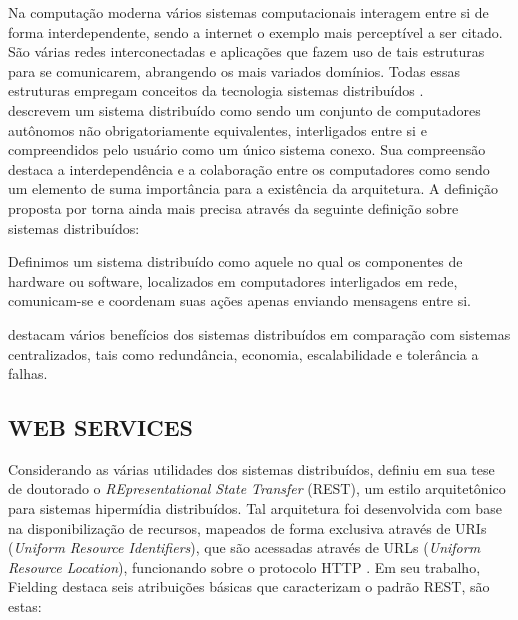 Na computação moderna vários sistemas computacionais interagem entre si de forma interdependente, sendo a internet o exemplo mais perceptível a ser citado. São várias redes interconectadas e aplicações que fazem uso de tais estruturas para se comunicarem, abrangendo os mais variados domínios. Todas essas estruturas empregam conceitos da tecnologia sistemas distribuídos \cite{puder2011distributed}.\\
 descrevem um sistema distribuído como sendo um conjunto de computadores autônomos não obrigatoriamente equivalentes, interligados entre si e compreendidos pelo usuário como um único sistema conexo. Sua compreensão destaca a interdependência e a colaboração entre os computadores como sendo um elemento de suma importância para a existência da arquitetura. A definição proposta por  torna ainda mais precisa através da seguinte definição sobre sistemas distribuídos:

\begin{citacao}
	Definimos um sistema distribuído como aquele no qual os componentes de hardware ou software, localizados em computadores interligados em rede, comunicam-se e coordenam suas ações apenas enviando mensagens entre si.
\end{citacao}

 destacam vários benefícios dos sistemas distribuídos em comparação com sistemas centralizados, tais como redundância, economia, escalabilidade e tolerância a falhas.

\subsection{WEB SERVICES}

Considerando as várias utilidades dos sistemas distribuídos,  definiu em sua tese de doutorado o \textit{REpresentational State Transfer} (REST), um estilo arquitetônico para sistemas hipermídia distribuídos. Tal arquitetura foi desenvolvida com base na disponibilização de recursos, mapeados de forma exclusiva através de URIs (\textit{Uniform Resource Identifiers}), que são acessadas através de URLs (\textit{Uniform Resource Location}), funcionando sobre o protocolo HTTP \cite{richardson2008restful}. Em seu trabalho, Fielding destaca seis atribuições básicas que caracterizam o padrão REST, são estas:

